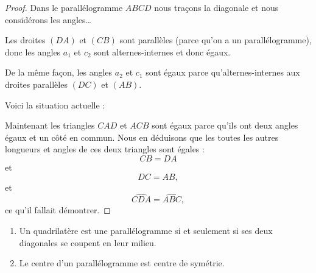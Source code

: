 \begin{proof}
    Dans le parallélogramme \( ABCD\) nous traçons la diagonale et nous considérons les angles\ldots

\begin{center}
   
\end{center}

    Les droites \( (DA)\) et \( (CB)\) sont parallèles (parce qu'on a un parallélogramme), donc les angles \( a_1\) et \( c_2\) sont alternes-internes et donc égaux.

    De la même façon, les angles \( a_2\) et \( c_1\) sont égaux parce qu'alternes-internes aux droites parallèles \( (DC)\) et \( (AB)\).

    Voici la situation actuelle :
    \begin{center}
        
    \end{center}
    Maintenant les triangles \( CAD\) et \( ACB\) sont égaux parce qu'ils ont deux angles égaux et un côté en commun. Nous en déduisons que les toutes les autres longueurs et angles de ces deux triangles sont égales :
    \begin{equation}
        CB=DA
    \end{equation}
    et
    \begin{equation}
        DC=AB,
    \end{equation}
    et
    \begin{equation}
     \widehat{CDA}=\widehat{ABC},
    \end{equation}
    ce qu'il fallait démontrer.
\end{proof}

\begin{propriete}
    \begin{enumerate}
        \item
            Un quadrilatère est une parallélogramme si et seulement si ses deux diagonales se coupent en leur milieu.
        \item
            Le centre d'un parallélogramme est centre de symétrie.
    \end{enumerate}
\end{propriete}


\begin{center}
   
\end{center}



